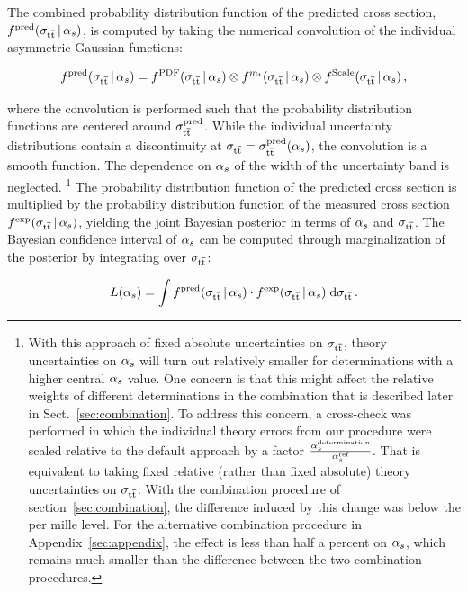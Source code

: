 The combined probability distribution function of the predicted cross
section, $f^{\text{pred}}(\sigma_{\mathrm{t}\overline{\mathrm{t}}}\,|\,\alpha_s)$, is computed by taking the
numerical convolution of the individual asymmetric Gaussian functions:
% 
\begin{linenomath*}
\begin{equation}
f^{\text{pred}}(\sigma_{\mathrm{t}\overline{\mathrm{t}}}\,|\,\alpha_s) = 
    f^{\text{PDF}}(\sigma_{\mathrm{t}\overline{\mathrm{t}}}\,|\,\alpha_s)    \otimes
    f^{m_{\mathrm{t}}}(\sigma_{\mathrm{t}\overline{\mathrm{t}}}\,|\,\alpha_s)           \otimes
    f^{\text{Scale}}(\sigma_{\mathrm{t}\overline{\mathrm{t}}}\,|\,\alpha_s)\,,
\end{equation}
\end{linenomath*}
% 
where the convolution is performed such that the probability distribution
functions are centered around $\sigma_{\mathrm{t}\overline{\mathrm{t}}}^\text{pred}$.
%
While the individual uncertainty distributions contain a discontinuity
at $\sigma_{\mathrm{t}\overline{\mathrm{t}}} = \sigma_{\mathrm{t}\overline{\mathrm{t}}}^{\text{pred}}(\alpha_s)$, the convolution is a smooth
function.
%
The dependence on $\alpha_s$ of the width of the uncertainty band is neglected.%
% 
\footnote{ With this approach of fixed absolute uncertainties on $\sigma_{\mathrm{t}\overline{\mathrm{t}}}$,
    theory uncertainties on $\alpha_s$ will turn out relatively smaller for
    determinations with a higher central $\alpha_s$ value.
    One concern is that this might affect the relative weights of
    different determinations in the combination that is described
    later in Sect.~\ref{sec:combination}.
    To address this concern, a cross-check was performed in which the
    individual theory errors from our procedure were scaled relative
    to the default approach by a factor
    $\frac{ \alpha_s^\text{determination} }{ \alpha_s^\text{ref} }$.
    That is equivalent to taking fixed relative (rather than fixed
    absolute) theory uncertainties on $\sigma_{\mathrm{t}\overline{\mathrm{t}}}$.
    With the combination procedure of section~\ref{sec:combination},
    the difference induced by this change was below the per mille
    level.
    For the alternative combination procedure in
    Appendix~\ref{sec:appendix}, the effect is less than half a 
    percent on $\alpha_s$, which remains much smaller than the difference
    between the two combination procedures.  }
%
The probability distribution function of the predicted cross section
is multiplied by the probability distribution function of the measured
cross section $f^{\text{exp}}(\sigma_{\mathrm{t}\overline{\mathrm{t}}}\,|\,\alpha_s)$, yielding the joint
Bayesian posterior in terms of $\alpha_s$ and $\sigma_{\mathrm{t}\overline{\mathrm{t}}}$. The Bayesian
confidence interval of $\alpha_s$ can be computed through marginalization
of the posterior by integrating over $\sigma_{\mathrm{t}\overline{\mathrm{t}}}$:
%
\begin{linenomath*}
\begin{equation}
  \label{eq:likelihood-master-equation}
  L(\alpha_s) = \int f^{\text{pred}}(\sigma_{\mathrm{t}\overline{\mathrm{t}}}\,|\,\alpha_s) 
  \cdot 
  f^{\text{exp}}(\sigma_{\mathrm{t}\overline{\mathrm{t}}}\,|\,\alpha_s) \; \text{d}\sigma_{\mathrm{t}\overline{\mathrm{t}}}\,.
\end{equation}
\end{linenomath*}
